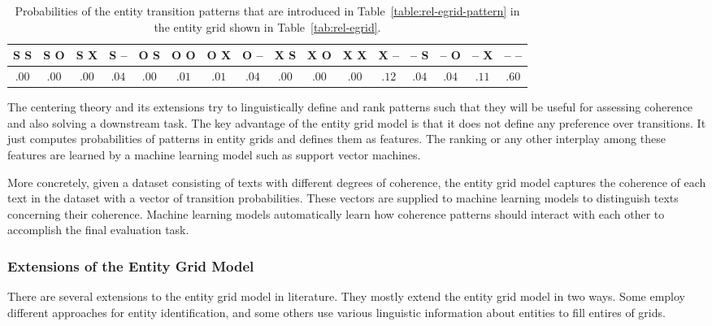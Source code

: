 \begin{table}
	\begin{center}
		\resizebox{\columnwidth}{!}
		{%
			\begin{tabular}{@{}cccccccccccccccc@{}}
				\toprule
				S S & S O & S X & S -- & O S & O O & O X & O -- & X S & X O & X X & X -- & -- S & -- O & -- X & -- -- \\
				\midrule
				$.00$ & $.00$ & $.00$ & $.04$ & $.00$ & $.01$ & $.01$ & $.04$ & $.00$ & $.00$ & $.00$ & $.12$ & $.04$ & $.04$ & $.11$ & $.60$ \\
				\bottomrule
			\end{tabular}
		}%
	\end{center}
	\caption{
	Probabilities of the entity transition patterns that are introduced in Table~\ref{table:rel-egrid-pattern} in the entity grid shown in Table~\ref{tab:rel-egrid}.
	}
	\label{tab:rel-egrid-probs}
\end{table}

The centering theory and its extensions try to linguistically define and rank patterns such that they will be useful for assessing coherence and also solving a downstream task.  
The key advantage of the entity grid model is that it does not define any preference over transitions. 
It just computes probabilities of patterns in entity grids and defines them as features. 
The ranking or any other interplay among these features are learned by a machine learning model such as support vector machines. 

More concretely, given a dataset consisting of texts with different degrees of coherence, the entity grid model captures the coherence of each text in the dataset with a vector of transition probabilities. 
These vectors are supplied to machine learning models to distinguish texts concerning their coherence.  
Machine learning models automatically learn how coherence patterns should interact with each other to accomplish the final evaluation task.  

\subsubsection{Extensions of the Entity Grid Model}
%
There are several extensions to the entity grid model in literature.  
They mostly extend the entity grid model in two ways. 
Some employ different approaches for entity identification, and some others use various linguistic information about entities to fill entires of grids. 

